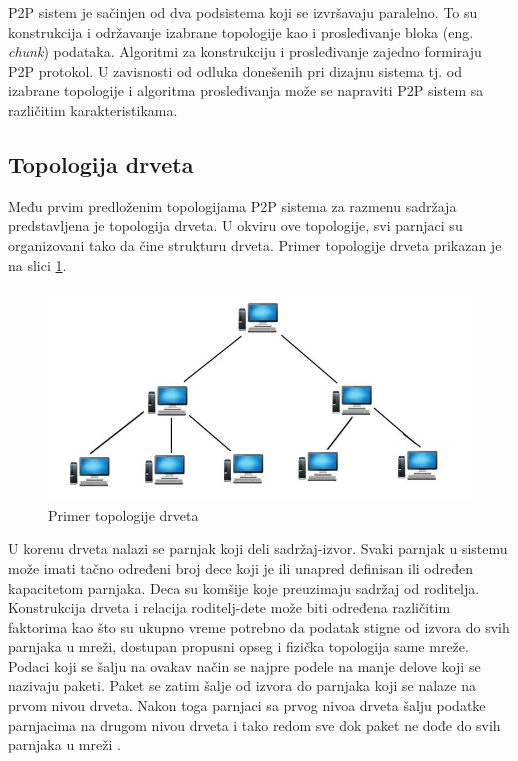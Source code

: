 \documentclass[12pt,oneside]{memoir}
\begin{document}
P2P sistem je sačinjen od dva podsistema koji se izvršavaju paralelno. To su konstrukcija i održavanje izabrane topologije kao i prosleđivanje bloka (eng. \textit{chunk}) podataka. Algoritmi za konstrukciju i prosleđivanje zajedno formiraju P2P protokol. U zavisnosti od odluka donešenih pri dizajnu sistema tj. od izabrane topologije i algoritma prosleđivanja može se napraviti P2P sistem sa različitim karakteristikama.

\subsection{Topologija drveta}
\label{P2P.3.1}

Među prvim predloženim topologijama P2P sistema za razmenu sadržaja predstavljena je topologija drveta. U okviru ove topologije, svi parnjaci su organizovani tako da čine strukturu drveta. Primer topologije drveta prikazan je na slici \ref{fig:topologija-drveta}.
 
\begin{figure}[!ht]
  \centering
  \includegraphics[width=1.05\textwidth]{slike/tree-topology.jpg}
  \caption{Primer topologije drveta}
  \label{fig:topologija-drveta}
\end{figure}
\par

U korenu drveta nalazi se parnjak koji deli sadržaj-izvor. Svaki parnjak u sistemu može imati tačno određeni broj dece koji je ili unapred definisan ili određen kapacitetom parnjaka. Deca su komšije koje preuzimaju sadržaj od roditelja. Konstrukcija drveta i relacija roditelj-dete može biti određena različitim faktorima kao što su ukupno vreme potrebno da podatak stigne od izvora do svih parnjaka u mreži, dostupan propusni opseg i fizička topologija same mreže. Podaci koji se šalju na ovakav način se najpre podele na manje delove koji se nazivaju paketi. Paket se zatim šalje od izvora do parnjaka koji se nalaze na prvom nivou drveta. Nakon toga parnjaci sa prvog nivoa drveta šalju podatke parnjacima na drugom nivou drveta i tako redom sve dok paket ne dođe do svih parnjaka u mreži \cite{DeBoever07}.
\end{document}
